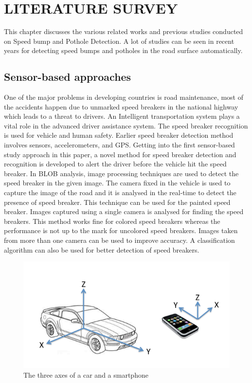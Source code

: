 \graphicspath{{Figures/chapter2}}
\chapter{LITERATURE SURVEY}
This chapter discusses the various related works and previous studies conducted on Speed bump and Pothole Detection. A lot of studies can be seen in recent years for detecting speed bumps and potholes in the road surface automatically.

\noindent
\section{Sensor-based approaches}
 One of the major problems in developing
countries is road maintenance, most of the
accidents happen due to unmarked speed breakers in the
national highway which leads to a threat to drivers. An
Intelligent transportation system plays a vital role in the
advanced driver assistance system. The speed breaker
recognition is used for vehicle and human safety.
Earlier speed breaker detection method involves
sensors, accelerometers, and GPS. Getting into the first sensor-based study approach in this paper,  a novel
method for speed breaker detection and recognition is
developed to alert the driver before the vehicle hit the
speed breaker\cite{R11}. In BLOB analysis, image processing techniques are used to detect the speed breaker in the given image. The camera fixed in the vehicle is used to capture the image of the road and it is analysed in the real-time to detect the presence of speed breaker. This technique can be used for the painted speed breaker. Images captured using a single camera is analysed for finding the speed breakers. This method works fine for colored speed breakers whereas the performance is not up to the mark for uncolored speed breakers. Images taken from more than one camera can be used to improve accuracy. A classification algorithm can also be used for better detection of speed breakers.
\begin{figure}[H]
    \centering
    \includegraphics[scale=0.9]{Figures/chapter2/sensor.png}
    \caption{The three axes of a car and a smartphone}
    \label{fig:carsensor}
\end{figure}

